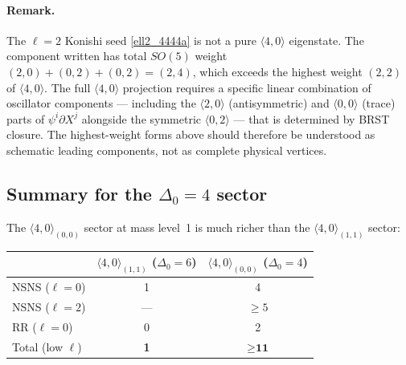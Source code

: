 \documentclass[12pt]{article}
\newcommand{\D}{\ensuremath{\Delta}}
\begin{document}
\paragraph{Remark.}
The $\ell=2$ Konishi seed \eqref{ell2_4444a} is not a pure $\langle 4,0\rangle$ eigenstate.
The component written has total $SO(5)$ weight
$(2,0)+(0,2)+(0,2)=(2,4)$, which exceeds the highest weight $(2,2)$ of $\langle 4,0\rangle$.
The full $\langle 4,0\rangle$ projection requires a specific linear combination of oscillator
components --- including the $\langle 2,0\rangle$ (antisymmetric) and $\langle 0,0\rangle$
(trace) parts of $\psi^i\partial X^j$ alongside the symmetric $\langle 0,2\rangle$ --- that
is determined by BRST closure. The highest-weight forms above should therefore be understood
as schematic leading components, not as complete physical vertices.

\subsection{Summary for the \texorpdfstring{$\D_0=4$}{Delta0=4} sector}

The $\langle 4,0\rangle_{(0,0)}$ sector at mass level~1 is much richer than the
$\langle 4,0\rangle_{(1,1)}$ sector:
\begin{center}
\begin{tabular}{|l|c|c|}
\hline
& $\langle 4,0\rangle_{(1,1)}$ ($\D_0=6$) & $\langle 4,0\rangle_{(0,0)}$ ($\D_0=4$) \\
\hline
NSNS ($\ell=0$) & 1 & 4 \\
NSNS ($\ell=2$) & --- & $\geq 5$ \\
RR ($\ell=0$) & 0 & 2 \\
\hline
Total (low $\ell$) & \textbf{1} & $\geq\textbf{11}$ \\
\hline
\end{tabular}
\end{center}
\end{document}
